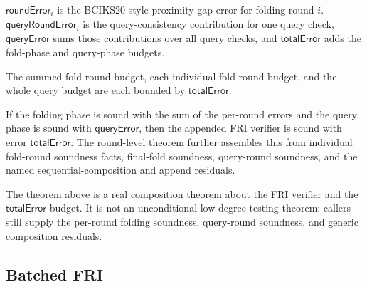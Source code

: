 \begin{definition}\label{def:fri_error}
    $\mathsf{roundError}_i$ is the BCIKS20-style proximity-gap error for folding round $i$.
    $\mathsf{queryRoundError}_i$ is the query-consistency contribution for one query check,
    $\mathsf{queryError}$ sums those contributions over all query checks, and
    $\mathsf{totalError}$ adds the fold-phase and query-phase budgets.
\end{definition}

\begin{lemma}\label{lem:fri_error_projections}
    The summed fold-round budget, each individual fold-round budget, and the whole query budget
    are each bounded by $\mathsf{totalError}$.
\end{lemma}

\begin{theorem}\label{thm:fri_soundness_total_error}
    If the folding phase is sound with the sum of the per-round errors and the query phase is
    sound with $\mathsf{queryError}$, then the appended FRI verifier is sound with error
    $\mathsf{totalError}$.  The round-level theorem further assembles this from individual
    fold-round soundness facts, final-fold soundness, query-round soundness, and the named
    sequential-composition and append residuals.
\end{theorem}

\begin{remark}\label{rem:fri_soundness_status}
    The theorem above is a real composition theorem about the FRI verifier and the
    $\mathsf{totalError}$ budget.  It is not an unconditional low-degree-testing theorem:
    callers still supply the per-round folding soundness, query-round soundness, and generic
    composition residuals.
\end{remark}

\subsection{Batched FRI}\label{sec:batched_fri}

